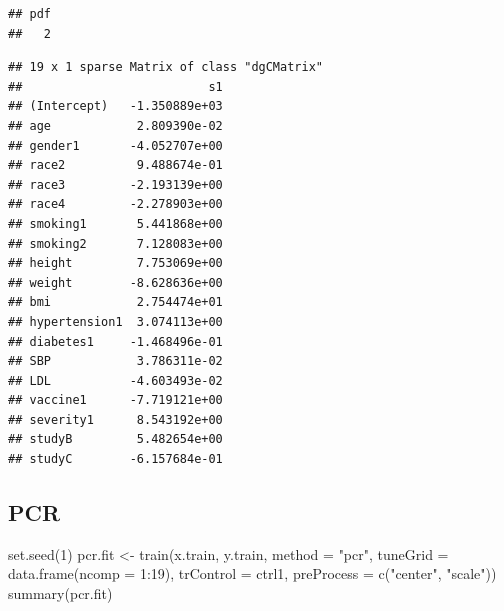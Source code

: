 \documentclass[
]{article}
\newenvironment{Shaded}{\begin{snugshade}}{\end{snugshade}}
\newcommand{\AttributeTok}[1]{\textcolor[rgb]{0.77,0.63,0.00}{#1}}
\newcommand{\DecValTok}[1]{\textcolor[rgb]{0.00,0.00,0.81}{#1}}
\newcommand{\FunctionTok}[1]{\textcolor[rgb]{0.00,0.00,0.00}{#1}}
\newcommand{\NormalTok}[1]{#1}
\newcommand{\OtherTok}[1]{\textcolor[rgb]{0.56,0.35,0.01}{#1}}
\newcommand{\SpecialCharTok}[1]{\textcolor[rgb]{0.00,0.00,0.00}{#1}}
\newcommand{\StringTok}[1]{\textcolor[rgb]{0.31,0.60,0.02}{#1}}
\begin{document}
\begin{verbatim}
## pdf 
##   2
\end{verbatim}

\begin{Shaded}
\end{Shaded}

\begin{verbatim}
## 19 x 1 sparse Matrix of class "dgCMatrix"
##                          s1
## (Intercept)   -1.350889e+03
## age            2.809390e-02
## gender1       -4.052707e+00
## race2          9.488674e-01
## race3         -2.193139e+00
## race4         -2.278903e+00
## smoking1       5.441868e+00
## smoking2       7.128083e+00
## height         7.753069e+00
## weight        -8.628636e+00
## bmi            2.754474e+01
## hypertension1  3.074113e+00
## diabetes1     -1.468496e-01
## SBP            3.786311e-02
## LDL           -4.603493e-02
## vaccine1      -7.719121e+00
## severity1      8.543192e+00
## studyB         5.482654e+00
## studyC        -6.157684e-01
\end{verbatim}

\hypertarget{pcr}{%
\subsection{PCR}\label{pcr}}

\begin{Shaded}
\begin{Highlighting}[]
\FunctionTok{set.seed}\NormalTok{(}\DecValTok{1}\NormalTok{)}
\NormalTok{pcr.fit }\OtherTok{\textless{}{-}} \FunctionTok{train}\NormalTok{(x.train, y.train,}
                 \AttributeTok{method =} \StringTok{"pcr"}\NormalTok{,}
                 \AttributeTok{tuneGrid  =} \FunctionTok{data.frame}\NormalTok{(}\AttributeTok{ncomp =} \DecValTok{1}\SpecialCharTok{:}\DecValTok{19}\NormalTok{),}
                 \AttributeTok{trControl =}\NormalTok{ ctrl1,}
                 \AttributeTok{preProcess =} \FunctionTok{c}\NormalTok{(}\StringTok{"center"}\NormalTok{, }\StringTok{"scale"}\NormalTok{))}
\FunctionTok{summary}\NormalTok{(pcr.fit)}
\end{Highlighting}
\end{Shaded}
\end{document}
